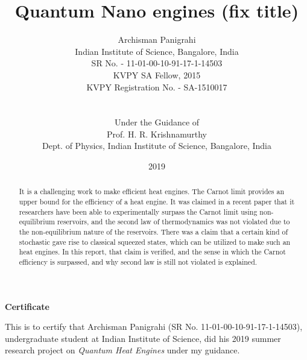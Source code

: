 \documentclass[12pt, twoside]{article}
\newcommand\blankpage{%
	\null
	\thispagestyle{empty}%
	\newpage}
\begin{document}
\setpagewiselinenumbers


\title{Quantum Nano engines (fix title)}

\date{2019}



\author{
	Archisman Panigrahi \\
	\footnotesize Indian Institute of Science, Bangalore, India\\
	\footnotesize SR No. - 11-01-00-10-91-17-1-14503\\
	\footnotesize KVPY SA Fellow, 2015\\
	\footnotesize KVPY Registration No. - SA-1510017\\\\\\
	\footnotesize Under the Guidance of\\
	Prof. H. R. Krishnamurthy\\
	\footnotesize Dept. of Physics, Indian Institute of Science, Bangalore, India}


\maketitle

\begin{abstract}

It is a challenging work to make efficient heat engines. The Carnot limit \cite{resnick_halliday} provides an upper bound for the efficiency of a heat engine. It was claimed in a recent paper \cite{klaers} that it researchers have been able to experimentally surpass the Carnot limit using non-equilibrium reservoirs, and the second law of thermodynamics was not violated due to the non-equilibrium nature of the reservoirs. There was a claim that a certain kind of stochastic gave rise to classical squeezed states, which can be utilized to make such an heat engines. In this report, that claim is verified, and the sense in which the Carnot efficiency is surpassed, and why second law is still not violated is explained.

\end{abstract}


\afterpage{\blankpage}
\begin{center}
	\large{\textbf{Certificate}}
\end{center}
\vspace{2 cm}
This is to certify that Archisman Panigrahi (SR No. 11-01-00-10-91-17-1-14503),
undergraduate student at Indian Institute of Science, did his 2019 summer research
project on \textit{Quantum Heat Engines} under my guidance.\\\\\\
\end{document}
